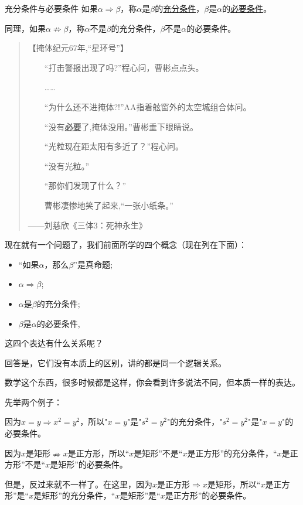 \documentclass[lang=cn,math=cm,chinesefont=nofont,11pt,scheme=chinese,onecol]{elegantbook}
\begin{document}
\begin{definition}{充分条件与必要条件}
  如果$\alpha\Rightarrow\beta$，称$\alpha$是$\beta$的\underline{充分条件}，$\beta$是$\alpha$的\underline{必要条件}。

  同理，如果$\alpha\nRightarrow\beta$，称$\alpha$不是$\beta$的充分条件，$\beta$不是$\alpha$的必要条件。
\end{definition}

\begin{quotation}
  【掩体纪元67年,“星环号”】

　　“打击警报出现了吗?”程心问，曹彬点点头。

　　……

　　“为什么还不进掩体?!”AA指着舷窗外的太空城组合体问。

　　“没有\underline{\textbf{必要}}了,掩体没用。”曹彬垂下眼睛说。

　　“光粒现在距太阳有多近了？”程心问。

　　“没有光粒。”

　　“那你们发现了什么？”

　　曹彬凄惨地笑了起来,“一张小纸条。”

——刘慈欣《三体3：死神永生》
\end{quotation}

现在就有一个问题了，我们前面所学的四个概念（现在列在下面）：
\begin{itemize}
  \item “如果$\alpha$，那么$\beta$”是真命题;
  \item $\alpha\Rightarrow\beta$;
  \item $\alpha$是$\beta$的充分条件;
  \item $\beta$是$\alpha$的必要条件,
\end{itemize}

这四个表达有什么关系呢？

回答是，它们没有本质上的区别，讲的都是同一个逻辑关系。

数学这个东西，很多时候都是这样，你会看到许多说法不同，但本质一样的表达。

\hspace*{\fill}

先举两个例子：

\begin{example}\label{202406262001}
  因为$x=y\Rightarrow x^2=y^2$，所以"$x=y$"是"$s^2=y^2$"的充分条件，"$s^2=y^2$"是"$x=y$"的必要条件。
\end{example}

\begin{example}\label{202406262002}
  因为$x$是矩形$\nRightarrow x$是正方形，所以“$x$是矩形”不是“$x$是正方形”的充分条件，“$x$是正方形”不是“$x$是矩形”的必要条件。

  但是，反过来就不一样了。在这里，因为$x$是正方形$\Rightarrow x$是矩形，所以“$x$是正方形”是“$x$是矩形”的充分条件，“$x$是矩形”是“$x$是正方形”的必要条件。
\end{example}
\end{document}
